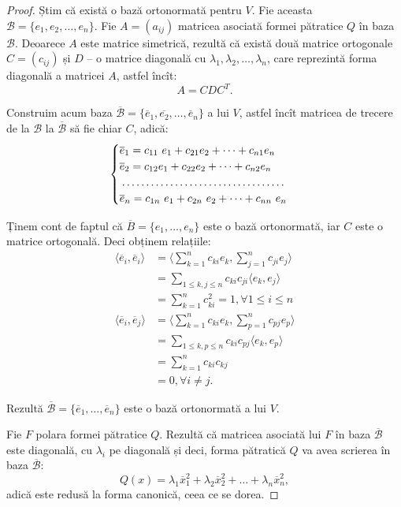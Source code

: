 \documentclass[11pt,a4paper]{article}
\theoremstyle{dotless}
\theoremstyle{dotlessdr}
\begin{document}
\begin{proof}
	Știm că există o bază ortonormată pentru $V$. Fie aceasta $\mathcal{B} = \{
e_1, e_2, \dots, e_n\}$. Fie $A = (a_{ij})$ matricea asociată formei pătratice
$Q$ în baza $\mathcal{B}$. Deoarece $A$ este matrice simetrică, rezultă că
există două matrice ortogonale $C = (c_{ij})$ și $D$ -- o matrice diagonală
cu $\lambda_1, \lambda_2, \dots, \lambda_n$, care reprezintă forma diagonală a
matricei $A$, astfel încît: 
 \[
	A = CDC^T.
\]

Construim acum baza $\overline{\mathcal{B}} = \{\overline{e}_1, \overline{e_2},
\dots, \overline{e}_n\}$ a lui $V$, astfel încît matricea de trecere de la 
$\mathcal{B}$ la $\overline{\mathcal{B}}$ să fie chiar $C$, adică: 
 \[
	\begin{cases}	
	    \overline{e}_1 = c_{11} e_1 + c_{21}e_2 + \dots + c_{n1} e_n \\
	    \overline{e}_2 = c_{12} e_1 + c_{22} e_2 + \dots + c_{n2} e_n \\
	    \dotfill \\
	    \overline{e}_n = c_{1n} e_1 + c_{2n} e_2 + \dots + c_{nn} e_n
    \end{cases}
\]

Ținem cont de faptul că $\overline{B} = \{e_1, \dots, e_n\}$ este o bază
ortonormată, iar $C$ este o matrice ortogonală. Deci obținem relațiile:
\begin{align*}
	\langle \overline{e}_i, \overline{e}_i \rangle &=
	\Big\langle \sum_{k = 1}^n c_{ki} e_k, \sum_{j = 1}^n c_{ji} e_j 
	\Big \rangle \\
	&= \sum_{1 \leq k, j \leq n} c_{ki} c_{ji} \langle e_k, e_j \rangle \\
	&= \sum_{k=1}^n c_{ki}^2 = 1, \forall 1 \leq i \leq n \\
    \langle \overline{e}_i, \overline{e}_j \rangle &=
    \Big\langle \sum_{k=1}^n c_{ki} e_k, \sum_{p=1}^n c_{pj}e_p 
    \Big \rangle \\
    &= \sum_{1 \leq k,p \leq n} c_{ki} c_{pj} \langle e_k, e_p \rangle \\
    &= \sum_{k = 1}^n c_{ki} c_{kj} \\
    &= 0, \forall i \neq j.
\end{align*}

Rezultă $\overline{\mathcal{B}} = \{\overline{e}_1, \dots, \overline{e}_n \}$
este o bază ortonormată a lui $V$.

Fie $F$ polara formei pătratice $Q$. Rezultă că matricea asociată lui $F$ în
baza $\overline{\mathcal{B}}$ este diagonală, cu $\lambda_i$ pe diagonală și
deci, forma pătratică $Q$ va avea scrierea în baza $\overline{\mathcal{B}}$: 
 \[
	Q(x) = \lambda_1 \overline{x}_1^2 + \lambda_2 \overline{x}_2^2 + \dots
	        + \lambda_n \overline{x}_n^2,
\]
adică este redusă la forma canonică, ceea ce se dorea.
\end{proof}
\end{document}
